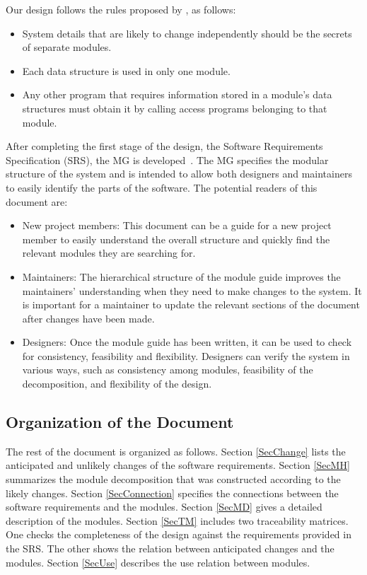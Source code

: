 \documentclass[12pt, titlepage]{article}
\begin{document}
Our design follows the rules proposed by \citet{ParnasEtAl1984}, as follows:
\begin{itemize}
\item System details that are likely to change independently should be the
  secrets of separate modules.
\item Each data structure is used in only one module.
\item Any other program that requires information stored in a module's data
  structures must obtain it by calling access programs belonging to that module.
\end{itemize}

After completing the first stage of the design, the Software Requirements
Specification (SRS), the MG is developed~\citep{ParnasEtAl1984}. The MG
specifies the modular structure of the system and is intended to allow both
designers and maintainers to easily identify the parts of the software.  The
potential readers of this document are:

\begin{itemize}
\item New project members: This document can be a guide for a new project member
  to easily understand the overall structure and quickly find the
  relevant modules they are searching for.
\item Maintainers: The hierarchical structure of the module guide improves the
  maintainers' understanding when they need to make changes to the system. It is
  important for a maintainer to update the relevant sections of the document
  after changes have been made.
\item Designers: Once the module guide has been written, it can be used to
  check for consistency, feasibility and flexibility. Designers can verify the
  system in various ways, such as consistency among modules, feasibility of the
  decomposition, and flexibility of the design.
\end{itemize}

\subsection{Organization of the Document}
The rest of the document is organized as follows. Section
\ref{SecChange} lists the anticipated and unlikely changes of the software
requirements. Section \ref{SecMH} summarizes the module decomposition that
was constructed according to the likely changes. Section \ref{SecConnection}
specifies the connections between the software requirements and the
modules. Section \ref{SecMD} gives a detailed description of the
modules. Section \ref{SecTM} includes two traceability matrices. One checks
the completeness of the design against the requirements provided in the SRS. The
other shows the relation between anticipated changes and the modules. Section
\ref{SecUse} describes the use relation between modules.
\end{document}
